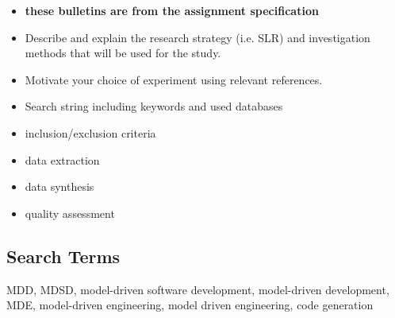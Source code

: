 \documentclass[10pt,twocolumn]{article}
\begin{document}





\begin{itemize}
\item \textbf{these bulletins are from the assignment specification}
\item Describe and explain the research strategy (i.e. SLR) and investigation methods that will be used for the study. 
\item Motivate your choice of experiment using relevant references. 
\item Search string including keywords and used databases
\item inclusion/exclusion criteria
\item data extraction
\item data synthesis
\item quality assessment
\end{itemize}

\begin{appendices}
\section{Search Terms}
MDD, MDSD, model-driven software development, model-driven development, MDE, model-driven engineering, model driven engineering, code generation
\end{appendices}
\end{document}
